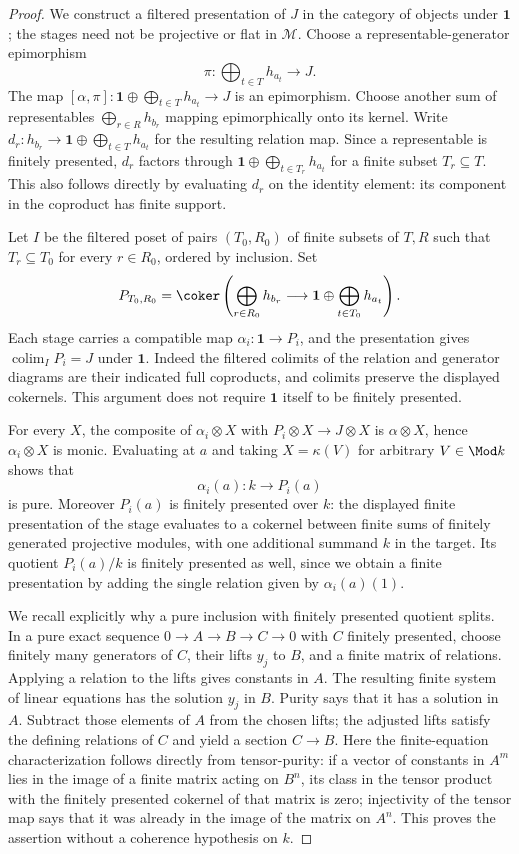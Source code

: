 \begin{proof}
We construct a filtered presentation of $J$ in the category of objects under $\mathbf1$; the stages need not be projective or flat in $\mathcal M$. Choose a representable-generator epimorphism
\[
 \pi:\bigoplus_{t\in T}h_{a_t}\longrightarrow J.
\]
The map $[\alpha,\pi]:\mathbf1\oplus\bigoplus_{t\in T}h_{a_t}\to J$ is an epimorphism. Choose another sum of representables $\bigoplus_{r\in R}h_{b_r}$ mapping epimorphically onto its kernel. Write $d_r:h_{b_r}\to\mathbf1\oplus\bigoplus_{t\in T}h_{a_t}$ for the resulting relation map. Since a representable is finitely presented, $d_r$ factors through $\mathbf1\oplus\bigoplus_{t\in T_r}h_{a_t}$ for a finite subset $T_r\subseteq T$. This also follows directly by evaluating $d_r$ on the identity element: its component in the coproduct has finite support.

Let $I$ be the filtered poset of pairs $(T_0,R_0)$ of finite subsets of $T,R$ such that $T_r\subseteq T_0$ for every $r\in R_0$, ordered by inclusion. Set
\[
 P_{T_0,R_0}=\coker\left(
 \bigoplus_{r\in R_0}h_{b_r}\longrightarrow
 \mathbf1\oplus\bigoplus_{t\in T_0}h_{a_t}\right).
\]
Each stage carries a compatible map $\alpha_i:\mathbf1\to P_i$, and the presentation gives $\operatorname{colim}_I P_i=J$ under $\mathbf1$. Indeed the filtered colimits of the relation and generator diagrams are their indicated full coproducts, and colimits preserve the displayed cokernels. This argument does not require $\mathbf1$ itself to be finitely presented.

For every $X$, the composite of $\alpha_i\otimes X$ with $P_i\otimes X\to J\otimes X$ is $\alpha\otimes X$, hence $\alpha_i\otimes X$ is monic. Evaluating at $a$ and taking $X=\kappa(V)$ for arbitrary $V\in\Mod k$ shows that
\[
 \alpha_i(a):k\longrightarrow P_i(a)
\]
is pure. Moreover $P_i(a)$ is finitely presented over $k$: the displayed finite presentation of the stage evaluates to a cokernel between finite sums of finitely generated projective modules, with one additional summand $k$ in the target. Its quotient $P_i(a)/k$ is finitely presented as well, since we obtain a finite presentation by adding the single relation given by $\alpha_i(a)(1)$.

We recall explicitly why a pure inclusion with finitely presented quotient splits. In a pure exact sequence $0\to A\to B\to C\to0$ with $C$ finitely presented, choose finitely many generators of $C$, their lifts $y_j$ to $B$, and a finite matrix of relations. Applying a relation to the lifts gives constants in $A$. The resulting finite system of linear equations has the solution $y_j$ in $B$. Purity says that it has a solution in $A$. Subtract those elements of $A$ from the chosen lifts; the adjusted lifts satisfy the defining relations of $C$ and yield a section $C\to B$. Here the finite-equation characterization follows directly from tensor-purity: if a vector of constants in $A^m$ lies in the image of a finite matrix acting on $B^n$, its class in the tensor product with the finitely presented cokernel of that matrix is zero; injectivity of the tensor map says that it was already in the image of the matrix on $A^n$. This proves the assertion without a coherence hypothesis on $k$.


\end{proof}
